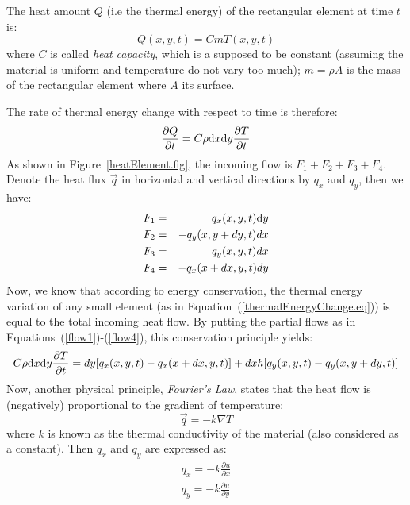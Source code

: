 \noindent The heat amount $Q$ (i.e the thermal energy) of the rectangular element at time $t$ is: 
\begin{equation}
Q(x,y,t)=C m T(x,y,t)
\end{equation}
where $C$ is called \emph{heat capacity}, which is a supposed to be constant (assuming the material is uniform and temperature do not vary too much); $m = \rho A$ is the mass of the rectangular element where $A$ its surface.

The rate of thermal energy change with respect to time is therefore:
\begin{equation}\label{thermalEnergyChange.eq}
\frac{\partial Q}{\partial t} = C\rho \mathrm d x \mathrm d y\frac{\partial T}{\partial t}
\end{equation}
As shown in Figure~\ref{heatElement.fig}, the incoming flow is $F_1 + F_2 + F_3 + F_4$. Denote the heat flux $\vec q$ in horizontal and vertical directions by $q_x$ and $q_y$, then we have:
\begin{eqnarray} %
F_1 &=& q_x(x,y,t)\ud y\label{flow1}\\
F_2 &=& -q_y(x,y+dy,t)dx\label{flow2}\\
F_3 &=& q_y(x,y,t)dx\label{flow3}\\
F_4 &=& -q_x(x+dx,y,t)dy\label{flow4}
\end{eqnarray}
Now, we know that according to energy conservation, the thermal energy variation of any small element (as in Equation~(\ref{thermalEnergyChange.eq})) is equal to the total incoming heat flow.  By putting the partial flows as in Equations~(\ref{flow1})-(\ref{flow4}), this conservation principle yields:
\begin{equation}\label{thermalEnergyChange.eq2}
C\rho \mathrm d x \mathrm d y\frac{\partial T}{\partial t} = dy [q_x(x,y,t)-q_x(x+dx,y,t)]+dxh[q_y(x,y,t)-q_y(x,y+dy,t)]
\end{equation}
Now, another physical principle, \emph{Fourier's Law}, states that the heat flow is (negatively) proportional to the gradient of temperature:
\begin{equation}\label{FourierLaw.eq}
\vec q = -k\nabla T
\end{equation}
where $k$ is known as the thermal conductivity of the material (also considered as a constant). Then $q_x$ and $q_y$ are expressed as:
\begin{equation}
\begin{split}
q_x=-k\frac{\partial u}{\partial x}\\
q_y=-k\frac{\partial u}{\partial y}
\end{split}
\end{equation}
